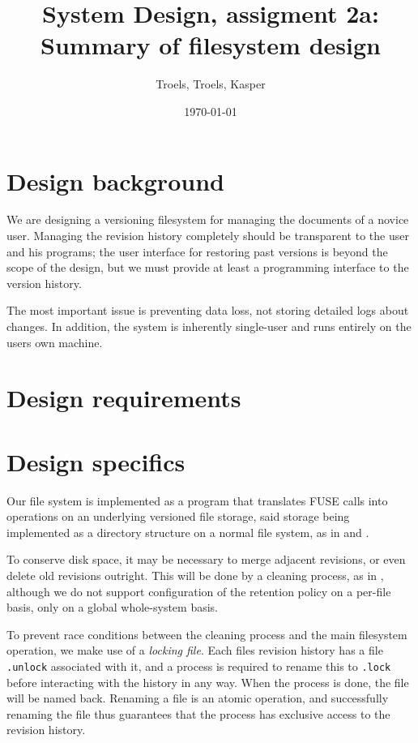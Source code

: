 \documentclass[12pt]{article}
\author{
        Troels, Troels, Kasper
}
\date{\today}
\title{System Design, assigment 2a:\\Summary of filesystem design}
\begin{document}
 
\maketitle
 
\section{Design background}

We are designing a versioning filesystem for managing the documents of
a novice user.  Managing the revision history completely should be
transparent to the user and his programs; the user interface for
restoring past versions is beyond the scope of the design, but we must
provide at least a programming interface to the version history.

The most important issue is preventing data loss, not storing detailed
logs about changes.  In addition, the system is inherently single-user
and runs entirely on the users own machine.

\section{Design requirements}

\section{Design specifics}

Our file system is implemented as a program that translates FUSE calls
into operations on an underlying versioned file storage, said storage
being implemented as a directory structure on a normal file system, as
in \cite{1096690} and \cite{Bustamante04wayback:a}.

To conserve disk space, it may be necessary to merge adjacent
revisions, or even delete old revisions outright.  This will be done
by a cleaning process, as in \cite{319159}, although we do not support
configuration of the retention policy on a per-file basis, only on a
global whole-system basis.

To prevent race conditions between the cleaning process and the main
filesystem operation, we make use of a \textit{locking file}.  Each
files revision history has a file \texttt{.unlock} associated with it,
and a process is required to rename this to \texttt{.lock} before
interacting with the history in any way.  When the process is done,
the file will be named back.  Renaming a file is an atomic operation,
and successfully renaming the file thus guarantees that the process
has exclusive access to the revision history.\cite{Santry:1999gf}
\end{document}
